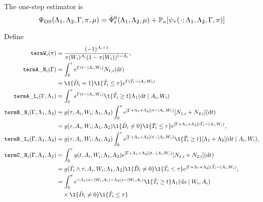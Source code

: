 \documentclass[a4,danish]{article}
\begin{document}
The one-step estimator is
\begin{equation*}
  \Psi_{\text{OS}}(\Lambda_1, \Lambda_2, \Gamma, \pi, \mu) =  
  \tilde{\Psi}_{t}^0(\Lambda_1, \Lambda_2, \mu)
  + \empmeas{[\psi_{\tau}(\blank; \Lambda_1, \Lambda_2, \Gamma, \pi)]}
\end{equation*}

Define
\begin{align*}
  \mathtt{termW}_i(\pi)
  & =
    \frac{(-1)^{A_i+1}}{\pi(W_i)^{A_i}(1-\pi(W_i))^{1-A_i}},
  \\
  \mathtt{termA\_N}_i(\Gamma)
  & =\int_0^{\tau} e^{\Gamma(t- \mid A_i, W_i)}   
    N_{1,i}(\diff t)
  \\
  & =
    \1{\{\tilde{D}_i = 1\}} \1{\{\tilde{T}_i \leq \tau \}}
    e^{\Gamma(\tilde{T}_i- \mid A_i, W_i)}   
  \\
  \mathtt{termA\_L}_i(\Gamma, \Lambda_1)
  & =\int_0^{\tau} e^{\Gamma(t- \mid A_i, W_i)}
    \1{\{\tilde{T}_i \geq t\}}
    \Lambda_1(\diff t \mid A_i, W_i)
  \\
  \mathtt{termB\_N}_i(\Gamma, \Lambda_1, \Lambda_2)
  & =
    g(\tau, A_i, W_i; \Lambda_1, \Lambda_2)
    \int_0^{\tau} e^{[\Gamma+\Lambda_1 + \Lambda_2](t- \mid A_i, W_i)}
    [N_{1,i}+N_{2,i}](\diff t)
  \\
  & =
    g(\tau, A_i, W_i; \Lambda_1, \Lambda_2)
    \1{\{\tilde{D}_i \not = 0\}} \1{\{\tilde{T}_i \leq \tau \}}
    e^{[\Gamma+\Lambda_1 + \Lambda_2](\tilde{T}_i- \mid A_i, W_i)},
  \\
  \mathtt{termB\_L}_i(\Gamma, \Lambda_1, \Lambda_2)
  & =
    g(\tau, A_i, W_i; \Lambda_1, \Lambda_2)
    \int_0^{\tau} e^{[\Gamma+\Lambda_1 + \Lambda_2](t- \mid A_i, W_i)}
    \1{\{\tilde{T}_i \geq t\}}
    [\Lambda_1+\Lambda_2](\diff t \mid A_i, W_i),
  \\
  \mathtt{termC\_N}_i(\Gamma, \Lambda_1, \Lambda_2)
  & =    
    \int_0^{\tau}
    g(t, A_i, W_i; \Lambda_1, \Lambda_2)e^{[\Gamma+\Lambda_1 + \Lambda_2](t- \mid A_i, W_i)}
    [N_{1,i}+N_{2,i}](\diff t)
  \\
  & =
    g(\tilde{T}_i \wedge \tau, A_i, W_i; \Lambda_1, \Lambda_2)
    \1{\{\tilde{D}_i \not = 0\}} \1{\{\tilde{T}_i \leq \tau \}}
    e^{[\Gamma+\Lambda_1 + \Lambda_2](\tilde{T}_i- \mid A_i, W_i)},
  \\
  & =
    \int_0^{\tau}
    e^{-\Lambda_1(s- \mid W_i, A_i)-\Lambda_2(s- \mid W_i, A_i)}
    \1{\{\tilde{T}_i \geq t\}}
    \Lambda_1(\diff s \mid W_i, A_i)
  \\
  & \quad \times
    \1{\{\tilde{D}_i \not = 0\}} \1{\{\tilde{T}_i \leq \tau \}}

\end{align*}
\end{document}
